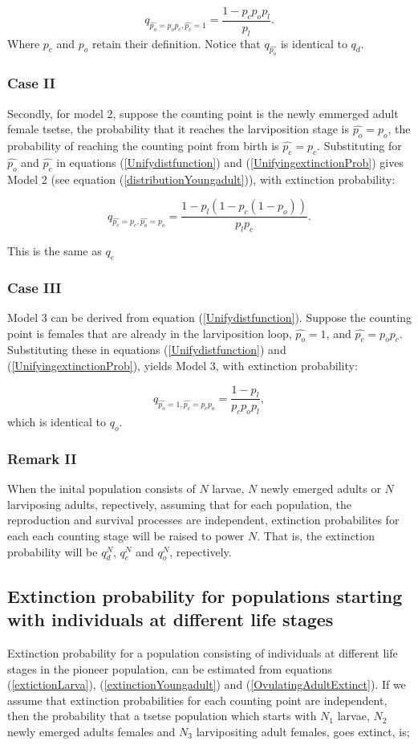 \documentclass[smallextended]{svjour3}
\begin{document}
 $$q_{\hat{p_o}=p_{o}p_{c},\hat{p_c}=1} = \frac{1-p_{c}p_{o}p_{l}}{p_{l}}.$$
Where $p_c$ and $p_o$ retain their definition. Notice that $q_{\hat{p_o}}$ is identical to $q_{d}$.  \\


\subsubsection*{Case II}
Secondly, for model 2, suppose the counting point is the newly emmerged adult female tsetse, the probability that it reaches the larviposition stage is $\hat{p_o} = p_{o}$, the probability of reaching the counting point from birth is $\hat{p_c}= p_{c}$. Substituting for $\hat{p_o}$ and $\hat{p_c}$ in equations (\ref{Unifydistfunction}) and (\ref{UnifyingextinctionProb}) gives Model 2 (see equation (\ref{distributionYoungadult})), with extinction probability: 

$$q_{\hat{p_c}=p_{c},\hat{p_o}=p_{o}} = \frac{1- p_{l}(1 - p_{c}(1- p_{o}))}{p_{l}p_{c}}. $$

This is the same as $q_{e}$

\subsubsection*{Case III}
Model 3 can be derived from equation (\ref{Unifydistfunction}). Suppose the counting point is females that are already in the larviposition loop, $\hat{p_o}=1$, and $\hat{p_c}=p_{o}p_{c}$. Substituting these in equations (\ref{Unifydistfunction}) and (\ref{UnifyingextinctionProb}), yields Model 3, with extinction probability:  

$$q_{\hat{p_o}=1,\hat{p_c}=p_{c}p_{o}} = \frac{1-p_{l}}{p_{c}p_{o}p_{l}},$$ 
which is identical to $q_{o}.$
\subsubsection*{\bf Remark II}
When the inital population consists of $N$ larvae, $N$ newly emerged adults or $N$ larviposing adults, repectively, assuming that for each population, the reproduction and survival processes are independent, extinction probabilites for each each counting stage will be raised to power $N$. That is, the extinction probability will be $q_d^N$, $q_e^N$ and $q_o^N$, repectively.  


\subsection{Extinction probability for  populations starting with individuals at different life stages}
 Extinction probability for a population consisting of individuals at different life stages in the pioneer population, can be estimated  from equations (\ref{extictionLarva}), (\ref{extinctionYoungadult}) and (\ref{OvulatingAdultExtinct}). If we assume that extinction probabilities for each counting point are independent, then the probability that a tsetse population which starts with $N_1$ larvae, $N_2$ newly emerged adults females and $N_3$ larvipositing adult females, goes extinct, is; 
\end{document}
